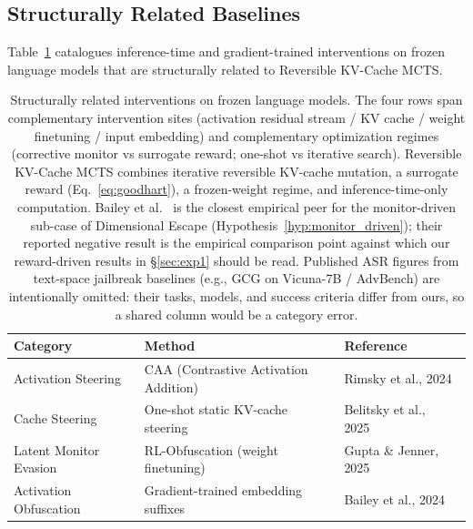 \documentclass{article}
\begin{document}
\subsection{Structurally Related Baselines}\label{sec:appendix-baselines}
Table~\ref{tab:baselines} catalogues inference-time and gradient-trained interventions on frozen language models that are structurally related to Reversible KV-Cache MCTS.
\begin{table}[t]
\centering
\small
\begin{tabular}{@{}lll@{}}
\toprule
\textbf{Category} & \textbf{Method} & \textbf{Reference} \\
\midrule
Activation Steering & CAA (Contrastive Activation Addition) & Rimsky et al., 2024~\cite{rimsky2024steering} \\
Cache Steering & One-shot static KV-cache steering & Belitsky et al., 2025~\cite{belitsky2025kvcache} \\
Latent Monitor Evasion & RL-Obfuscation (weight finetuning) & Gupta \& Jenner, 2025~\cite{gupta2025rlobfuscation} \\
Activation Obfuscation & Gradient-trained embedding suffixes & Bailey et al., 2024~\cite{bailey2024obfuscated} \\
\bottomrule
\end{tabular}
\caption{Structurally related interventions on frozen language models. The four rows span complementary intervention sites (activation residual stream / KV cache / weight finetuning / input embedding) and complementary optimization regimes (corrective monitor vs surrogate reward; one-shot vs iterative search). Reversible KV-Cache MCTS combines iterative reversible KV-cache mutation, a surrogate reward (Eq.~\ref{eq:goodhart}), a frozen-weight regime, and inference-time-only computation. Bailey et al.~\cite{bailey2024obfuscated} is the closest empirical peer for the monitor-driven sub-case of Dimensional Escape (Hypothesis~\ref{hyp:monitor_driven}); their reported negative result is the empirical comparison point against which our reward-driven results in §\ref{sec:exp1} should be read. Published ASR figures from text-space jailbreak baselines (e.g., GCG on Vicuna-7B / AdvBench) are intentionally omitted: their tasks, models, and success criteria differ from ours, so a shared column would be a category error.}
\label{tab:baselines}
\end{table}

\end{document}
